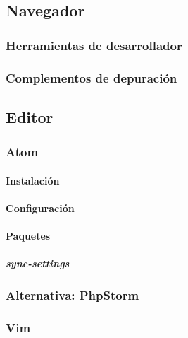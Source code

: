 \documentclass[a4paper,11pt,spanish]{sphinxmanual}
\begin{document}
\subsection{Navegador}
\label{\detokenize{introduccion:id28}}

\subsubsection{Herramientas de desarrollador}
\label{\detokenize{introduccion:id29}}

\subsubsection{Complementos de depuración}
\label{\detokenize{introduccion:id30}}

\subsection{Editor}
\label{\detokenize{introduccion:id31}}

\subsubsection{Atom}
\label{\detokenize{introduccion:id32}}

\paragraph{Instalación}
\label{\detokenize{introduccion:id33}}

\paragraph{Configuración}
\label{\detokenize{introduccion:id34}}

\paragraph{Paquetes}
\label{\detokenize{introduccion:id35}}

\subparagraph{sync-settings}
\label{\detokenize{introduccion:id36}}

\subsubsection{Alternativa: PhpStorm}
\label{\detokenize{introduccion:id37}}

\subsubsection{Vim}
\label{\detokenize{introduccion:id38}}
\end{document}
